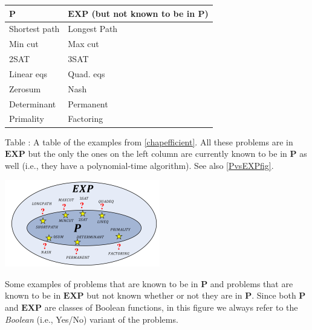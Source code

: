 \begin{longtable}[]{@{}ll@{}}
\toprule
\(\mathbf{P}\) & \(\mathbf{EXP}\) (but not known to be in
\(\mathbf{P}\))\tabularnewline
\midrule
\endhead
Shortest path & Longest Path\tabularnewline
Min cut & Max cut\tabularnewline
2SAT & 3SAT\tabularnewline
Linear eqs & Quad. eqs\tabularnewline
Zerosum & Nash\tabularnewline
Determinant & Permanent\tabularnewline
Primality & Factoring\tabularnewline
\bottomrule
\end{longtable}

Table : A table of the examples from \cref{chapefficient}. All these
problems are in \(\mathbf{EXP}\) but the only the ones on the left
column are currently known to be in \(\mathbf{P}\) as well (i.e., they
have a polynomial-time algorithm). See also \cref{PvsEXPfig}.


\begin{marginfigure}
\centering
\includegraphics[width=\linewidth, height=1.5in, keepaspectratio]{../figure/PvsEXP.png}
\caption{Some examples of problems that are known to be in
\(\mathbf{P}\) and problems that are known to be in \(\mathbf{EXP}\) but
not known whether or not they are in \(\mathbf{P}\). Since both
\(\mathbf{P}\) and \(\mathbf{EXP}\) are classes of Boolean functions, in
this figure we always refer to the \emph{Boolean} (i.e., Yes/No) variant
of the problems.}
\label{PvsEXPfig}
\end{marginfigure}

\hypertarget{booleanversion}{}

